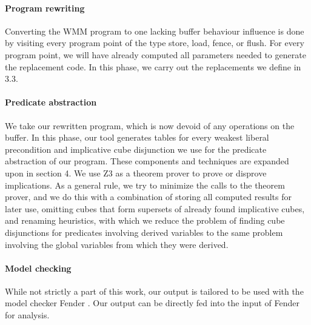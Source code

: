 \paragraph{Program rewriting}

Converting the WMM program to one lacking buffer behaviour influence is done by visiting every program point of the type store, load, fence, or flush. For every program point, we will have already computed all parameters needed to generate the replacement code. In this phase, we carry out the replacements we define in 3.3.

\paragraph{Predicate abstraction}

We take our rewritten program, which is now devoid of any operations on the buffer. In this phase, our tool generates tables for every weakest liberal precondition and implicative cube disjunction we use for the predicate abstraction of our program. These components and techniques are expanded upon in section 4. We use Z3 \cite{z3} as a theorem prover to prove or disprove implications. As a general rule, we try to minimize the calls to the theorem prover, and we do this with a combination of storing all computed results for later use, omitting cubes that form supersets of already found implicative cubes, and renaming heuristics, with which we reduce the problem of finding cube disjunctions for predicates involving derived variables to the same problem involving the global variables from which they were derived.

\paragraph{Model checking}

While not strictly a part of this work, our output is tailored to be used with the model checker Fender \cite{fender}. Our output can be directly fed into the input of Fender for analysis.